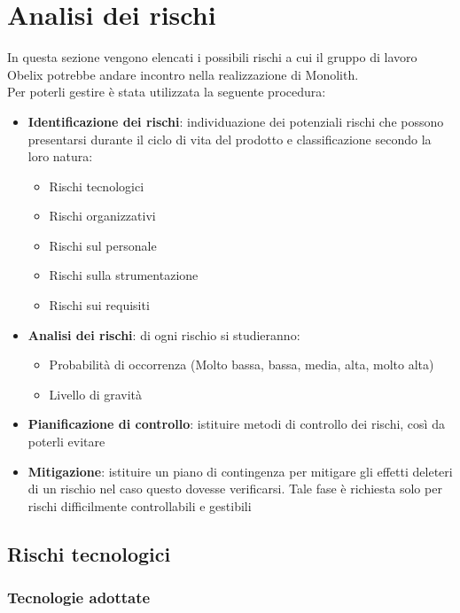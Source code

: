 \section{Analisi dei rischi}
In questa sezione vengono elencati i possibili rischi a cui il gruppo di lavoro Obelix potrebbe andare incontro nella realizzazione di Monolith.\\Per poterli gestire è stata utilizzata la seguente procedura:
\begin{itemize}
\item \textbf{Identificazione dei rischi}: individuazione dei potenziali rischi che possono presentarsi durante il ciclo di vita del prodotto e classificazione secondo la loro natura:
  \begin{itemize}
  \item Rischi tecnologici\item Rischi organizzativi\item Rischi sul personale\item Rischi sulla strumentazione\item Rischi sui requisiti
  \end{itemize}

\item \textbf{Analisi dei rischi}: di ogni rischio si studieranno:
  \begin{itemize}
  \item Probabilità di occorrenza (Molto bassa, bassa, media, alta, molto alta)\item Livello di gravità
  \end{itemize}

\item \textbf{Pianificazione di controllo}: istituire metodi di controllo dei  rischi, così da poterli evitare
\item \textbf{Mitigazione}: istituire un piano di contingenza per
  mitigare gli effetti deleteri di un rischio nel caso questo
  dovesse verificarsi. Tale fase è richiesta solo per rischi
  difficilmente controllabili e gestibili
\end{itemize}

\subsection{Rischi tecnologici}
\subsubsection{Tecnologie adottate}

